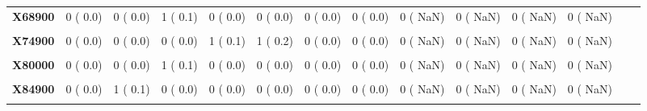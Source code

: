 \documentclass[
]{article}
\begin{document}
\begin{table}[H]
\begin{tabular}[t]{>{\raggedright\arraybackslash}p{5em}ccccccccccccc}
\textbf{X68900} & 0 (  0.0) & 0 (  0.0) & 1 (  0.1) & 0 (  0.0) & 0 (  0.0) & 0 (  0.0) & 0 (  0.0) & 0 (  NaN) & 0 (  NaN) & 0 (  NaN) & 0 (  NaN) &  & \\
\textbf{\cellcolor{gray!10}{X70900}} & \cellcolor{gray!10}{1 (  0.1)} & \cellcolor{gray!10}{0 (  0.0)} & \cellcolor{gray!10}{0 (  0.0)} & \cellcolor{gray!10}{0 (  0.0)} & \cellcolor{gray!10}{0 (  0.0)} & \cellcolor{gray!10}{0 (  0.0)} & \cellcolor{gray!10}{0 (  0.0)} & \cellcolor{gray!10}{0 (  NaN)} & \cellcolor{gray!10}{0 (  NaN)} & \cellcolor{gray!10}{0 (  NaN)} & \cellcolor{gray!10}{0 (  NaN)} & \cellcolor{gray!10}{} & \cellcolor{gray!10}{}\\
\textbf{X74900} & 0 (  0.0) & 0 (  0.0) & 0 (  0.0) & 1 (  0.1) & 1 (  0.2) & 0 (  0.0) & 0 (  0.0) & 0 (  NaN) & 0 (  NaN) & 0 (  NaN) & 0 (  NaN) &  & \\
\textbf{\cellcolor{gray!10}{X76900}} & \cellcolor{gray!10}{0 (  0.0)} & \cellcolor{gray!10}{0 (  0.0)} & \cellcolor{gray!10}{1 (  0.1)} & \cellcolor{gray!10}{0 (  0.0)} & \cellcolor{gray!10}{0 (  0.0)} & \cellcolor{gray!10}{0 (  0.0)} & \cellcolor{gray!10}{0 (  0.0)} & \cellcolor{gray!10}{0 (  NaN)} & \cellcolor{gray!10}{0 (  NaN)} & \cellcolor{gray!10}{0 (  NaN)} & \cellcolor{gray!10}{0 (  NaN)} & \cellcolor{gray!10}{} & \cellcolor{gray!10}{}\\
\textbf{X80000} & 0 (  0.0) & 0 (  0.0) & 1 (  0.1) & 0 (  0.0) & 0 (  0.0) & 0 (  0.0) & 0 (  0.0) & 0 (  NaN) & 0 (  NaN) & 0 (  NaN) & 0 (  NaN) &  & \\
\textbf{\cellcolor{gray!10}{X80900}} & \cellcolor{gray!10}{0 (  0.0)} & \cellcolor{gray!10}{0 (  0.0)} & \cellcolor{gray!10}{0 (  0.0)} & \cellcolor{gray!10}{1 (  0.1)} & \cellcolor{gray!10}{0 (  0.0)} & \cellcolor{gray!10}{0 (  0.0)} & \cellcolor{gray!10}{0 (  0.0)} & \cellcolor{gray!10}{0 (  NaN)} & \cellcolor{gray!10}{0 (  NaN)} & \cellcolor{gray!10}{0 (  NaN)} & \cellcolor{gray!10}{0 (  NaN)} & \cellcolor{gray!10}{} & \cellcolor{gray!10}{}\\
\textbf{X84900} & 0 (  0.0) & 1 (  0.1) & 0 (  0.0) & 0 (  0.0) & 0 (  0.0) & 0 (  0.0) & 0 (  0.0) & 0 (  NaN) & 0 (  NaN) & 0 (  NaN) & 0 (  NaN) &  & \\
\textbf{\cellcolor{gray!10}{X95900}} & \cellcolor{gray!10}{0 (  0.0)} & \cellcolor{gray!10}{1 (  0.1)} & \cellcolor{gray!10}{0 (  0.0)} & \cellcolor{gray!10}{1 (  0.1)} & \cellcolor{gray!10}{0 (  0.0)} & \cellcolor{gray!10}{0 (  0.0)} & \cellcolor{gray!10}{0 (  0.0)} & \cellcolor{gray!10}{0 (  NaN)} & \cellcolor{gray!10}{0 (  NaN)} & \cellcolor{gray!10}{0 (  NaN)} & \cellcolor{gray!10}{0 (  NaN)} & \cellcolor{gray!10}{} & \cellcolor{gray!10}{}\\

\end{tabular}
\end{table}
\end{document}
